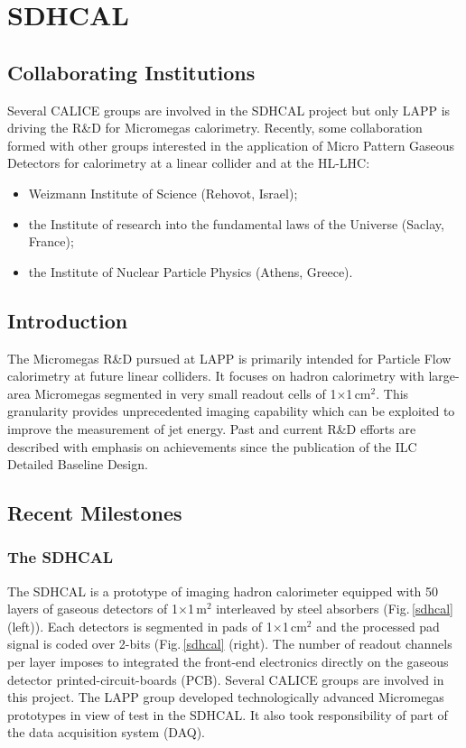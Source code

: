 \section{SDHCAL}
\subsection{Collaborating Institutions}
Several CALICE groups are involved in the SDHCAL project but only LAPP is driving the R\&D for Micromegas calorimetry. Recently, some collaboration formed with other groups interested in the application of Micro Pattern Gaseous Detectors for calorimetry at a linear collider and at the HL-LHC:

\begin{itemize}
\item
Weizmann Institute of Science (Rehovot, Israel);
\item
the Institute of research into the fundamental laws of the Universe (Saclay, France);
\item
the Institute of Nuclear Particle Physics (Athens, Greece).
\end{itemize}

\subsection{Introduction}
The Micromegas R\&D pursued at LAPP is primarily intended for Particle Flow calorimetry at future linear colliders. It focuses on hadron calorimetry with large-area Micromegas segmented in very small readout cells of 1$\times$1\,cm$^{2}$. This granularity provides unprecedented imaging capability which can be exploited to improve the measurement of jet energy. Past and current R\&D efforts are described with emphasis on achievements since the publication of the ILC Detailed Baseline Design.
\subsection{Recent Milestones}


\subsubsection{The SDHCAL}

The SDHCAL is a prototype of imaging hadron calorimeter equipped with 50 layers of gaseous detectors of 1$\times$1\,m$^{2}$ interleaved by steel absorbers (Fig.\,\ref{sdhcal} (left)). Each detectors is segmented in pads of 1$\times$1\,cm$^{2}$ and the processed pad signal is coded over 2-bits (Fig.\,\ref{sdhcal} (right). The number of readout channels per layer imposes to integrated the front-end electronics directly on the gaseous detector printed-circuit-boards (PCB). Several CALICE groups are involved in this project. The LAPP group developed technologically advanced Micromegas prototypes in view of test in the SDHCAL. It also took responsibility of part of the data acquisition system (DAQ).


